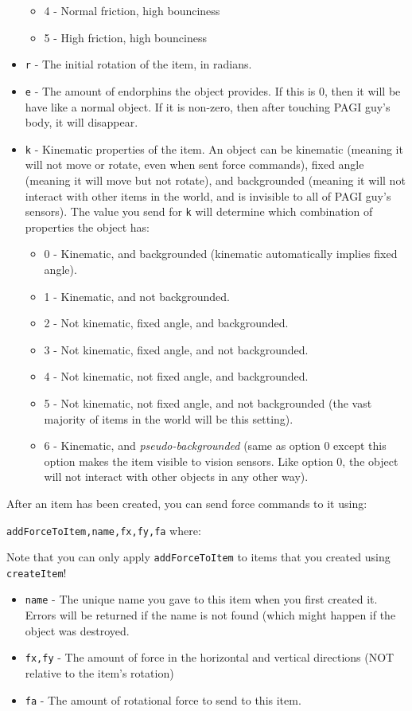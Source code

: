 \begin{itemize}
\begin{itemize}
	\item 4 - Normal friction, high bounciness
	\item 5 - High friction, high bounciness
	\end{itemize}
\item \texttt{r} - The initial rotation of the item, in radians. 
\item \texttt{e} - The amount of endorphins the object provides. If this is 0, then it will be have like a normal object. If it is non-zero, then after touching PAGI guy's body, it will disappear.
\item \texttt{k} - Kinematic properties of the item. An object can be kinematic (meaning it will not move or rotate, even when sent force commands), fixed angle (meaning it will move but not rotate), and backgrounded (meaning it will not interact with other items in the world, and is invisible to all of PAGI guy's sensors). The value you send for \texttt{k} will determine which combination of properties the object has:
	\begin{itemize}
	\item 0 - Kinematic, and backgrounded (kinematic automatically implies fixed angle).
	\item 1 - Kinematic, and not backgrounded. 
	\item 2 - Not kinematic, fixed angle, and backgrounded.
	\item 3 - Not kinematic, fixed angle, and not backgrounded.
	\item 4 - Not kinematic, not fixed angle, and backgrounded.
	\item 5 - Not kinematic, not fixed angle, and not backgrounded (the vast majority of items in the world will be this setting).
	\item 6 - Kinematic, and \textit{pseudo-backgrounded} (same as option 0 except this option makes the item visible to vision sensors. Like option 0, the object will not interact with other objects in any other way).
	\end{itemize}
\end{itemize}

After an item has been created, you can send force commands to it using:

\texttt{addForceToItem,name,fx,fy,fa} where:

\noindent Note that you can only apply \texttt{addForceToItem} to items that you created using \texttt{createItem}!

\begin{itemize}
\item \texttt{name} - The unique name you gave to this item when you first created it. Errors will be returned if the name is not found (which might happen if the object was destroyed.
\item \texttt{fx,fy} - The amount of force in the horizontal and vertical directions (NOT relative to the item's rotation)
\item \texttt{fa} - The amount of rotational force to send to this item.
\end{itemize}

